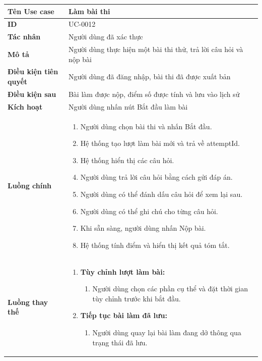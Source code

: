{
\renewcommand{\arraystretch}{1.5}

\begin{tabularx}{\textwidth}{|>{\raggedright\arraybackslash}X|>{\raggedright\arraybackslash}X|}
\hline
\textbf{Tên Use case} & Làm bài thi \\
\hline
\textbf{ID} & UC-0012 \\
\hline
\textbf{Tác nhân} & Người dùng đã xác thực \\
\hline
\textbf{Mô tả} & Người dùng thực hiện một bài thi thử, trả lời câu hỏi và nộp bài \\
\hline
\textbf{Điều kiện tiên quyết} & Người dùng đã đăng nhập, bài thi đã được xuất bản \\
\hline
\textbf{Điều kiện sau} & Bài làm được nộp, điểm số được tính và lưu vào lịch sử \\
\hline
\textbf{Kích hoạt} & Người dùng nhấn nút Bắt đầu làm bài \\
\hline
\textbf{Luồng chính} &
\begin{enumerate}
    \item Người dùng chọn bài thi và nhấn Bắt đầu.
    \item Hệ thống tạo lượt làm bài mới và trả về attemptId.
    \item Hệ thống hiển thị các câu hỏi.
    \item Người dùng trả lời câu hỏi bằng cách gửi đáp án.
    \item Người dùng có thể đánh dấu câu hỏi để xem lại sau.
    \item Người dùng có thể ghi chú cho từng câu hỏi.
    \item Khi sẵn sàng, người dùng nhấn Nộp bài.
    \item Hệ thống tính điểm và hiển thị kết quả tóm tắt.
\end{enumerate} \\
\hline
\textbf{Luồng thay thế} &
\begin{enumerate}
    \item \textbf{Tùy chỉnh lượt làm bài:}
    \begin{enumerate}
        \item[1A.] Người dùng chọn các phần cụ thể và đặt thời gian tùy chỉnh trước khi bắt đầu.
    \end{enumerate}
    \item \textbf{Tiếp tục bài làm đã lưu:}
    \begin{enumerate}
        \item[1B.] Người dùng quay lại bài làm đang dở thông qua trạng thái đã lưu.

\end{enumerate}
\end{enumerate}
\end{tabularx}}
